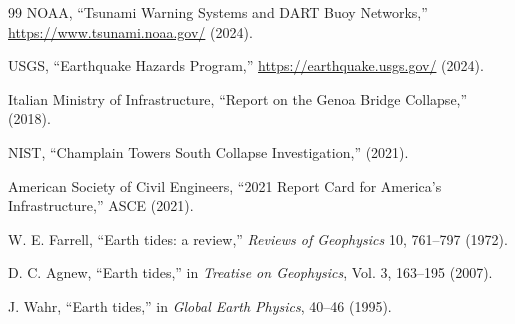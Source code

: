 \documentclass[12pt,a4paper]{article}
\theoremstyle{remark}
\begin{document}
\begin{thebibliography}{99}
	NOAA, ``Tsunami Warning Systems and DART Buoy Networks,'' \url{https://www.tsunami.noaa.gov/} (2024).
	
	USGS, ``Earthquake Hazards Program,'' \url{https://earthquake.usgs.gov/} (2024).
	
	Italian Ministry of Infrastructure, ``Report on the Genoa Bridge Collapse,'' (2018).
	
	NIST, ``Champlain Towers South Collapse Investigation,'' (2021).
	
	American Society of Civil Engineers, ``2021 Report Card for America's Infrastructure,'' ASCE (2021).
	
	W. E. Farrell, ``Earth tides: a review,'' \emph{Reviews of Geophysics} 10, 761–797 (1972).
	
	D. C. Agnew, ``Earth tides,'' in \emph{Treatise on Geophysics}, Vol. 3, 163–195 (2007).
	
	J. Wahr, ``Earth tides,'' in \emph{Global Earth Physics}, 40–46 (1995).
	
\end{thebibliography}	
\end{document}
